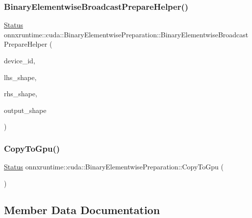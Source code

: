 \subsubsection{\texorpdfstring{Binary\+Elementwise\+Broadcast\+Prepare\+Helper()}{BinaryElementwiseBroadcastPrepareHelper()}}
{\footnotesize\ttfamily \mbox{\hyperlink{classonnxruntime_1_1common_1_1Status}{Status}} onnxruntime\+::cuda\+::\+Binary\+Elementwise\+Preparation\+::\+Binary\+Elementwise\+Broadcast\+Prepare\+Helper (\begin{DoxyParamCaption}\item[{int}]{device\+\_\+id,  }\item[{const \mbox{\hyperlink{classonnxruntime_1_1TensorShape}{Tensor\+Shape}} \&}]{lhs\+\_\+shape,  }\item[{const \mbox{\hyperlink{classonnxruntime_1_1TensorShape}{Tensor\+Shape}} \&}]{rhs\+\_\+shape,  }\item[{const \mbox{\hyperlink{classonnxruntime_1_1TensorShape}{Tensor\+Shape}} \&}]{output\+\_\+shape }\end{DoxyParamCaption})\hspace{0.3cm}{\ttfamily [inline]}}

\mbox{\label{structonnxruntime_1_1cuda_1_1BinaryElementwisePreparation_ae8057fc5747b8c08a40df19422ca41b0}} 
\subsubsection{\texorpdfstring{Copy\+To\+Gpu()}{CopyToGpu()}}
{\footnotesize\ttfamily \mbox{\hyperlink{classonnxruntime_1_1common_1_1Status}{Status}} onnxruntime\+::cuda\+::\+Binary\+Elementwise\+Preparation\+::\+Copy\+To\+Gpu (\begin{DoxyParamCaption}{ }\end{DoxyParamCaption})\hspace{0.3cm}{\ttfamily [inline]}}



\subsection{Member Data Documentation}
\mbox{\label{structonnxruntime_1_1cuda_1_1BinaryElementwisePreparation_ac07a5b9eca61fcc7295038038d306cda}} 
